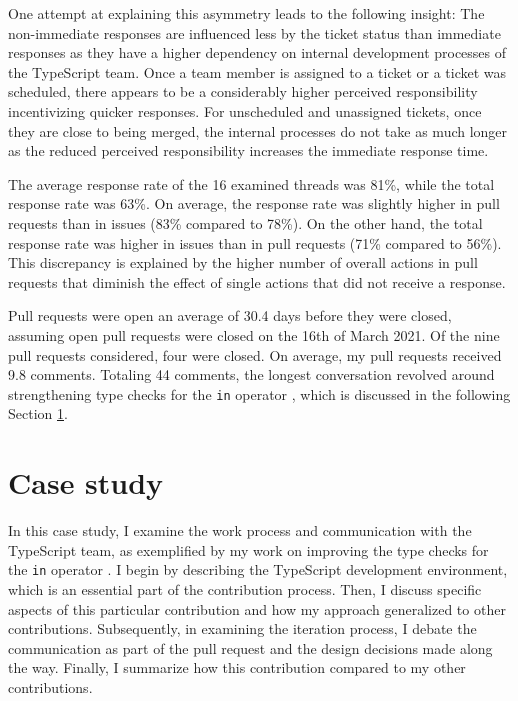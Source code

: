 \documentclass[12pt]{scrartcl}
\def\code#1{\texttt{\frenchspacing#1}}
\begin{document}
One attempt at explaining this asymmetry leads to the following insight: The non-immediate responses are influenced less by the ticket status than immediate responses as they have a higher dependency on internal development processes of the TypeScript team. Once a team member is assigned to a ticket or a ticket was scheduled, there appears to be a considerably higher perceived responsibility incentivizing quicker responses. For unscheduled and unassigned tickets, once they are close to being merged, the internal processes do not take as much longer as the reduced perceived responsibility increases the immediate response time.

The average response rate of the 16 examined threads was 81\%, while the total response rate was 63\%. On average, the response rate was slightly higher in pull requests than in issues (83\% compared to 78\%). On the other hand, the total response rate was higher in issues than in pull requests (71\% compared to 56\%). This discrepancy is explained by the higher number of overall actions in pull requests that diminish the effect of single actions that did not receive a response.

Pull requests were open an average of 30.4 days before they were closed, assuming open pull requests were closed on the 16th of March 2021. Of the nine pull requests considered, four were closed. On average, my pull requests received 9.8 comments. Totaling 44 comments, the longest conversation revolved around strengthening type checks for the \code{in} operator \cite{41317}, which is discussed in the following Section \ref{case_study}.

\section{Case study}
\label{case_study}

In this case study, I examine the work process and communication with the TypeScript team, as exemplified by my work on improving the type checks for the \code{in} operator \cite{41317}. I begin by describing the TypeScript development environment, which is an essential part of the contribution process. Then, I discuss specific aspects of this particular contribution and how my approach generalized to other contributions. Subsequently, in examining the iteration process, I debate the communication as part of the pull request and the design decisions made along the way. Finally, I summarize how this contribution compared to my other contributions.
\end{document}
